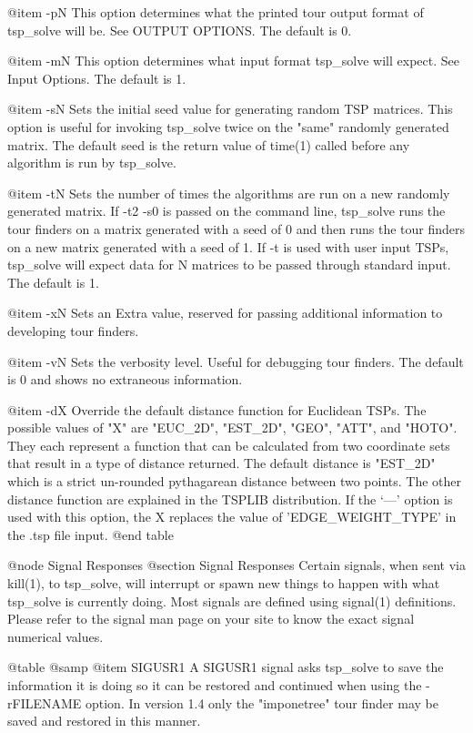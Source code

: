 @item -pN
This option determines what the printed tour output format of tsp_solve will
be.  See OUTPUT OPTIONS.  The default is 0.

@item -mN
This option determines what input format tsp_solve will expect.
See Input Options.  The default is 1.

@item -sN
Sets the initial seed value for generating random TSP matrices.  This option is
useful for invoking tsp_solve twice on the "same" randomly generated matrix.
The default seed is the return value of time(1) called before any algorithm is
run by tsp_solve.

@item -tN
Sets the number of times the algorithms are run on a new randomly generated
matrix.  If -t2 -s0 is passed on the command line, tsp_solve runs the tour
finders on a matrix generated with a seed of 0 and then runs the tour finders
on a new matrix generated with a seed of 1.  If -t is used with user input
TSPs, tsp_solve will expect data for N matrices to be passed through standard
input.  The default is 1.

@item -xN
Sets an Extra value, reserved for passing additional information to developing
tour finders.

@item -vN Sets the verbosity level.  Useful for debugging tour finders.  The
default is 0 and shows no extraneous information.

@item -dX
Override the default distance function for Euclidean TSPs.  The possible
values of "X" are "EUC_2D", "EST_2D", "GEO", "ATT", and "HOTO".  They each
represent a function that can be calculated from two coordinate sets that
result in a type of distance returned.  The default distance is "EST_2D"
which is a strict un-rounded pythagarean distance between two points.  The
other distance function are explained in the TSPLIB distribution.  If the
`---' option is used with this option, the X replaces the value of
'EDGE_WEIGHT_TYPE' in the .tsp file input.
@end table

@node Signal Responses
@section Signal Responses
Certain signals, when sent via kill(1), to tsp_solve, will interrupt or
spawn new things to happen with what tsp_solve is currently doing.  Most
signals are defined using signal(1) definitions.  Please refer to the signal
man page on your site to know the exact signal numerical values.

@table @samp
@item SIGUSR1
A SIGUSR1 signal asks tsp_solve to save the information it is doing
so it can be restored and continued when using the -rFILENAME option.  In
version 1.4 only the "imponetree" tour finder may be saved and restored in
this manner.


